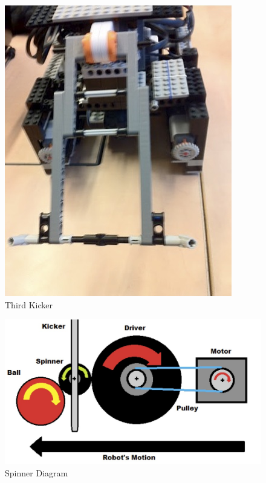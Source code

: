 \documentclass[12pt, a4paper, titlepage]{article}
\begin{document}
\begin{figure}[ht]
\begin{centering}
\begin{minipage}[b]{0.3\linewidth}
\includegraphics[scale=0.5]{images/robot/thirdkicker.jpg}
\caption{Third Kicker}
\label{fig:thirdkicker}
\end{minipage}
\end{centering}
\end{figure}

\begin{figure}[ht]
\centering
\includegraphics[scale=0.8]{images/robot/spinner.jpg}
\caption{Spinner Diagram}
\label{fig:spinner}
\end{figure}
\end{document}
